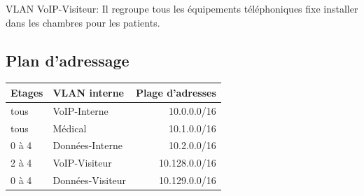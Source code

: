VLAN VoIP-Visiteur:
Il regroupe  tous les équipements téléphoniques fixe installer dans les chambres pour les patients.



%
%
\subsection{Plan d'adressage}

    \begin{center}
        \begin{tabular}{|l|l|r|}
          \hline
            Etages  &   VLAN interne    &   Plage d'adresses \\
          \hline
            tous    &   VoIP-Interne    &   10.0.0.0/16 \\
          \hline
            tous    &   Médical         &   10.1.0.0/16 \\
          \hline
            0 à 4   &   Données-Interne &   10.2.0.0/16 \\
          \hline
            2 à 4   &   VoIP-Visiteur   &   10.128.0.0/16 \\
          \hline
            0 à 4   &  Données-Visiteur &   10.129.0.0/16 \\
          \hline
        \end{tabular}
    \end{center}

%
%
